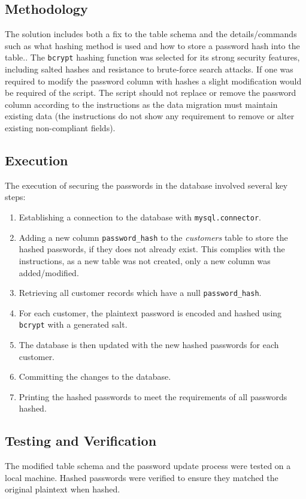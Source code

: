 \documentclass{article}
\begin{document}
\subsection*{Methodology}
The solution includes both a fix to the table schema and the details/commands such as what hashing
method is used and how to store a password hash into the table.. The \texttt{bcrypt} hashing function was selected for its strong security features, including salted hashes and resistance to brute-force search attacks. If one was required to modify the password column with hashes a slight modification would be required of the script. The script should not replace or remove the password column according to the instructions as the data migration must maintain existing data (the instructions do not show any requirement to remove or alter existing non-compliant fields).

\subsection*{Execution}
The execution of securing the passwords in the database involved several key steps:
\begin{enumerate}
    \item Establishing a connection to the database with \texttt{mysql.connector}.
    \item Adding a new column \texttt{password\_hash} to the \textit{customers} table to store the hashed passwords, if they does not already exist. This complies with the instructions, as a new table was not created, only a new column was added/modified. 
    \item Retrieving all customer records which have a null \texttt{password\_hash}.
    \item For each customer, the plaintext password is encoded and hashed using \texttt{bcrypt} with a generated salt.
    \item The database is then updated with the new hashed passwords for each customer.
    \item Committing the changes to the database.
    \item Printing the hashed passwords to meet the requirements of all passwords hashed.
\end{enumerate}

\subsection*{Testing and Verification}
The modified table schema and the password update process were tested on a local machine. Hashed passwords were verified to ensure they matched the original plaintext when hashed.
\end{document}
